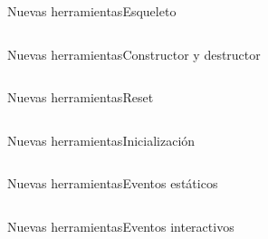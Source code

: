 
\begin{frame}{Nuevas herramientas}{Esqueleto}
	\begin{center}
		\begin{minipage}{0.9\textwidth}
			\inputminted{cpp}{code/cpp/tool_skeleton.cpp}
		\end{minipage}
	\end{center}
\end{frame}

\begin{frame}{Nuevas herramientas}{Constructor y destructor}
	\begin{center}
	\begin{minipage}{0.7\textwidth}
		\inputminted{cpp}{code/cpp/tool_constructor.cpp}
	\end{minipage}
	\end{center}
\end{frame}

\begin{frame}{Nuevas herramientas}{Reset}
\begin{center}
\begin{minipage}{0.7\textwidth}
	\inputminted{cpp}{code/cpp/tool_reset.cpp}
\end{minipage}
\end{center}
\end{frame}

\begin{frame}{Nuevas herramientas}{Inicialización}
\begin{center}
\begin{minipage}{0.7\textwidth}
	\inputminted{cpp}{code/cpp/tool_init.cpp}
\end{minipage}
\end{center}
\end{frame}

\begin{frame}{Nuevas herramientas}{Eventos estáticos}
\begin{center}
\begin{minipage}{0.85\textwidth}
	\inputminted{cpp}{code/cpp/tool_transitions.cpp}
\end{minipage}
\end{center}
\end{frame}

\begin{frame}{Nuevas herramientas}{Eventos interactivos}
\begin{center}
\begin{minipage}{0.8\textwidth}
	\inputminted{cpp}{code/cpp/tool_transitions_interactive.cpp}
\end{minipage}
\end{center}
\end{frame}

